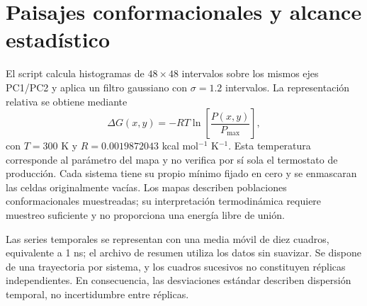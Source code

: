 \documentclass[12 pt, letter, oneside]{book}
\begin{document}
\section{Paisajes conformacionales y alcance estadístico}
El script  calcula histogramas de $48\times48$ intervalos sobre los mismos ejes PC1/PC2 y aplica un filtro gaussiano con $\sigma=1.2$ intervalos. La representación relativa se obtiene mediante
\begin{equation}
 \Delta G(x,y)=-RT\ln\!\left[\frac{P(x,y)}{P_{\max}}\right],
\end{equation}
con $T=300$ K y $R=0.0019872043$ kcal mol$^{-1}$ K$^{-1}$. Esta temperatura corresponde al parámetro del mapa y no verifica por sí sola el termostato de producción. Cada sistema tiene su propio mínimo fijado en cero y se enmascaran las celdas originalmente vacías. Los mapas describen poblaciones conformacionales muestreadas; su interpretación termodinámica requiere muestreo suficiente y no proporciona una energía libre de unión.

Las series temporales se representan con una media móvil de diez cuadros, equivalente a 1 ns; el archivo de resumen utiliza los datos sin suavizar. Se dispone de una trayectoria por sistema, y los cuadros sucesivos no constituyen réplicas independientes. En consecuencia, las desviaciones estándar describen dispersión temporal, no incertidumbre entre réplicas.


\clearpage
\end{document}
